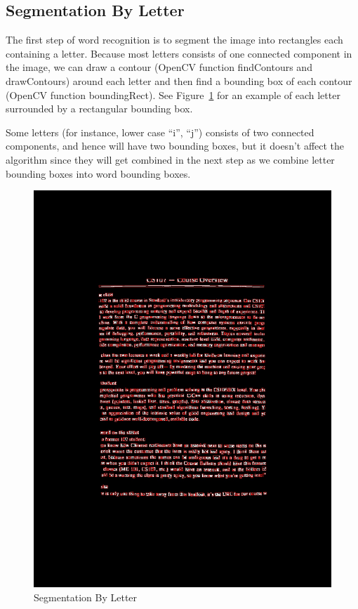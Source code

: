 \documentclass[conference]{IEEEtran}
\begin{document}
\subsection{Segmentation By Letter}
The first step of word recognition is to segment the image into rectangles each containing a letter.  Because most letters consists of one connected component in the image, we can draw a contour (OpenCV function findContours and drawContours) around each letter and then find a bounding box of each contour (OpenCV function boundingRect). See Figure~\ref{letterbbox} for an example of each letter surrounded by a rectangular bounding box.

Some letters (for instance, lower case ``i'', ``j'') consists of two connected components, and hence will have two bounding boxes, but it doesn't affect the algorithm since they will get combined in the next step as we combine letter bounding boxes into word bounding boxes.

\begin{figure}
\center
\includegraphics[scale=0.15]{letter_with_bounding_box.jpg}
\caption{Segmentation By Letter}
\label{letterbbox}
\end{figure}
\end{document}
